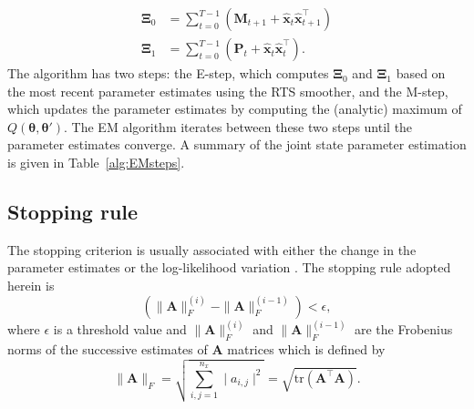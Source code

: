 \documentclass[review,authoryear,3p]{elsarticle}
\begin{document}
\begin{align}
\boldsymbol\Xi_0&=\sum_{t=0}^{T-1}\left(\mathbf M_{t+1}+\mathbf{\hat x}_t\mathbf{\hat x}_{t+1}^\top\right) \label{eq:Xi0} \\
 \boldsymbol\Xi_1&=\sum_{t=0}^{T-1}\left(\mathbf P_t+\mathbf{\hat x}_t\mathbf{\hat x}_t^\top\right).  \label{eq:Xi1}
\end{align} 
The algorithm has two steps: the E-step, which computes $\boldsymbol\Xi_0$ and $\boldsymbol\Xi_1$ based on the most recent parameter estimates using the RTS smoother, and the M-step, which updates the parameter estimates by computing the (analytic) maximum of $Q(\boldsymbol\theta,\boldsymbol\theta')$. The EM algorithm iterates between these two steps until the parameter estimates converge. A summary of the joint state parameter estimation is given in Table~\ref{alg:EMsteps}.   
\subsection{Stopping rule}
The stopping criterion is usually associated with either the change in the parameter estimates or the log-likelihood variation \citep{McLachlan1997}. The stopping rule adopted herein is
\begin{equation}
 \left(\parallel \mathbf{A} \parallel_{F}^{(i)}-\parallel \mathbf{A} \parallel_{F}^{(i-1)}\right)<\epsilon,
 \end{equation}
 where $\epsilon$ is a threshold value and $\parallel \mathbf{A} \parallel_{F}^{(i)}$ and $ \parallel \mathbf{A} \parallel_{F}^{(i-1)}$ are the Frobenius norms  of the successive estimates of $\mathbf{A} $ matrices which is defined by \citet{Meyer2000}
 \begin{equation}
  \parallel \mathbf{A} \parallel_{F}=\sqrt{\sum_{i,j=1}^{n_x}\mid a_{i,j} \mid^2}=\sqrt{\mathrm{tr} (\mathbf A^{\top}\mathbf A)}.
 \end{equation}
\end{document}
